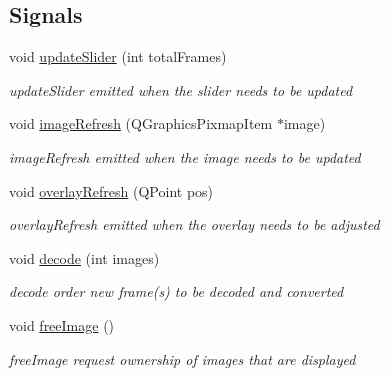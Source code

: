 \subsection*{Signals}
\begin{DoxyCompactItemize}
\item 
void \hyperlink{classVideoHandler_abab55d876a0733246bb93b03d9bb4e6f}{update\+Slider} (int total\+Frames)
\begin{DoxyCompactList}\small\item\em update\+Slider emitted when the slider needs to be updated \end{DoxyCompactList}\item 
void \hyperlink{classVideoHandler_ad27bed625ae493aaaeae4e141062868f}{image\+Refresh} (Q\+Graphics\+Pixmap\+Item $\ast$image)
\begin{DoxyCompactList}\small\item\em image\+Refresh emitted when the image needs to be updated \end{DoxyCompactList}\item 
void \hyperlink{classVideoHandler_afc0683e30a8dee583596e2beac972133}{overlay\+Refresh} (Q\+Point pos)
\begin{DoxyCompactList}\small\item\em overlay\+Refresh emitted when the overlay needs to be adjusted \end{DoxyCompactList}\item 
void \hyperlink{classVideoHandler_ab7b0fb78bcfb33c5b7b33716a3f3e640}{decode} (int images)
\begin{DoxyCompactList}\small\item\em decode order new frame(s) to be decoded and converted \end{DoxyCompactList}\item 
void \hyperlink{classVideoHandler_a2840450055e030beb1239a0fbe638831}{free\+Image} ()\hypertarget{classVideoHandler_a2840450055e030beb1239a0fbe638831}{}\label{classVideoHandler_a2840450055e030beb1239a0fbe638831}

\begin{DoxyCompactList}\small\item\em free\+Image request ownership of images that are displayed \end{DoxyCompactList}\end{DoxyCompactItemize}

